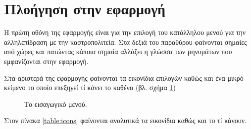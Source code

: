 \documentclass[a4paper,titlepage,twoside,12pt,leqno]{article}
\begin{document}
\section{Πλοήγηση στην εφαρμογή}


Η πρώτη οθόνη της εφαρμογής είναι για την επιλογή του κατάλληλου μενού για την αλληλεπίδραση με την καστροπολιτεία. Στα δεξιά του παραθύρου φαίνονται σημαίες από χώρες και πατώντας κάποια σημαία αλλάζει η γλώσσα των μηνυμάτων που εμφανίζονται στην εφαρμογή.

Στα αριστερά της εφαρμογής φαίνονται τα εικονίδια επιλογών καθώς και ένα μικρό κείμενο το οποίο επεξηγεί τί κάνει το καθένα (βλ. σχήμα \ref{fig:menu:general})

\begin{figure}
\begin{center}
\caption{Το εισαγωγικό μενού.}
\label{fig:menu:general}
\end{center}
\end{figure}

Στον πίνακα \ref{table:icons} φαίνονται αναλυτικά τα εικονίδια καθώς και το τί κάνουν.
\end{document}
